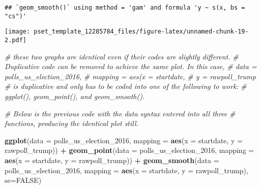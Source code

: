 \documentclass[
]{article}
\newenvironment{Shaded}{\begin{snugshade}}{\end{snugshade}}
\newcommand{\CommentTok}[1]{\textcolor[rgb]{0.56,0.35,0.01}{\textit{#1}}}
\newcommand{\DataTypeTok}[1]{\textcolor[rgb]{0.13,0.29,0.53}{#1}}
\newcommand{\DecValTok}[1]{\textcolor[rgb]{0.00,0.00,0.81}{#1}}
\newcommand{\KeywordTok}[1]{\textcolor[rgb]{0.13,0.29,0.53}{\textbf{#1}}}
\newcommand{\NormalTok}[1]{#1}
\newcommand{\OperatorTok}[1]{\textcolor[rgb]{0.81,0.36,0.00}{\textbf{#1}}}
\newcommand{\OtherTok}[1]{\textcolor[rgb]{0.56,0.35,0.01}{#1}}
\newcommand{\StringTok}[1]{\textcolor[rgb]{0.31,0.60,0.02}{#1}}
\begin{document}
\begin{enumerate}
\begin{verbatim}
## `geom_smooth()` using method = 'gam' and formula 'y ~ s(x, bs = "cs")'
\end{verbatim}

  \texttt{[image: pset\_template\_12285784\_files/figure-latex/unnamed-chunk-19-2.pdf]}

\begin{Shaded}
\begin{Highlighting}[]
\CommentTok{# these two graphs are identical even if their codes are slightly different.}
\CommentTok{# Duplicative code can be removed to achieve the same plot. In this case,}
\CommentTok{# data = polls_us_election_2016, }
\CommentTok{#              mapping = aes(x = startdate, }
\CommentTok{#                            y = rawpoll_trump}
\CommentTok{# is duplicative and only has to be coded into one of the following to work:}
\CommentTok{# ggplot(), geom_point(), and geom_smooth().}
\end{Highlighting}
\end{Shaded}
\end{enumerate}

\begin{Shaded}
\begin{Highlighting}[]
\CommentTok{# Below is the previous code with the data syntax entered into all three }
\CommentTok{# functions, producing the identical plot still.}

 \KeywordTok{ggplot}\NormalTok{(}\DataTypeTok{data =}\NormalTok{ polls_us_election_}\DecValTok{2016}\NormalTok{, }
                 \DataTypeTok{mapping =} \KeywordTok{aes}\NormalTok{(}\DataTypeTok{x =}\NormalTok{ startdate, }
                               \DataTypeTok{y =}\NormalTok{ rawpoll_trump)) }\OperatorTok{+}
\StringTok{      }\KeywordTok{geom_point}\NormalTok{(}\DataTypeTok{data =}\NormalTok{ polls_us_election_}\DecValTok{2016}\NormalTok{, }
                 \DataTypeTok{mapping =} \KeywordTok{aes}\NormalTok{(}\DataTypeTok{x =}\NormalTok{ startdate, }
                               \DataTypeTok{y =}\NormalTok{ rawpoll_trump)) }\OperatorTok{+}
\StringTok{      }\KeywordTok{geom_smooth}\NormalTok{(}\DataTypeTok{data =}\NormalTok{ polls_us_election_}\DecValTok{2016}\NormalTok{, }
                  \DataTypeTok{mapping =} \KeywordTok{aes}\NormalTok{(}\DataTypeTok{x =}\NormalTok{ startdate, }
                                \DataTypeTok{y =}\NormalTok{ rawpoll_trump), }\DataTypeTok{se=}\OtherTok{FALSE}\NormalTok{)}
\end{Highlighting}
\end{Shaded}
\end{document}
